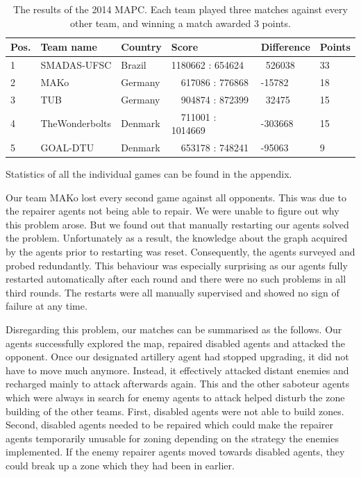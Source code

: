 \begin{table}[ht]
  \centering
  \begin{tabularx}{\textwidth}{| l | X | p{2cm} | X | p{2cm} | l |}
    \hline
    \textbf{Pos.} & \textbf{Team name} & \textbf{Country} & \textbf{Score}       & \textbf{Difference} & \textbf{Points} \\ \hline
    1             & SMADAS-UFSC        & Brazil           & 1180662 : 654624     & \ 526038            & 33              \\
    2             & MAKo               & Germany          & \ \ 617086 : 776868  & -15782              & 18              \\
    3             & TUB                & Germany          & \ \ 904874 : 872399  & \ 32475             & 15              \\
    4             & TheWonderbolts     & Denmark          & \ \ 711001 : 1014669 & -303668             & 15              \\
    5             & GOAL-DTU           & Denmark          & \ \ 653178 : 748241  & -95063              & 9               \\ \hline
  \end{tabularx}
  \caption{The results of the 2014 MAPC. Each team played three matches against every other team, and winning a match awarded 3 points.}
  \label{tab:mapc2014results}
\end{table}
Statistics of all the individual games can be found in the appendix.

Our team MAKo lost every second game against all opponents.
This was due to the repairer agents not being able to repair.
We were unable to figure out why this problem arose.
But we found out that manually restarting our agents solved the problem.
Unfortunately as a result, the knowledge about the graph acquired by the agents prior to restarting was reset.
Consequently, the agents surveyed and probed redundantly.
This behaviour was especially surprising as our agents fully restarted automatically after each round and there were no such problems in all third rounds.
The restarts were all manually supervised and showed no sign of failure at any time.

Disregarding this problem, our matches can be summarised as the follows.
Our agents successfully explored the map, repaired disabled agents and attacked the opponent.
Once our designated artillery agent had stopped upgrading, it did not have to move much anymore.
Instead, it effectively attacked distant enemies and recharged mainly to attack afterwards again.
This and the other saboteur agents which were always in search for enemy agents to attack helped disturb the zone building of the other teams.
First, disabled agents were not able to build zones.
Second, disabled agents needed to be repaired which could make the repairer agents temporarily unusable for zoning depending on the strategy the enemies implemented.
If the enemy repairer agents moved towards disabled agents, they could break up a zone which they had been in earlier.

